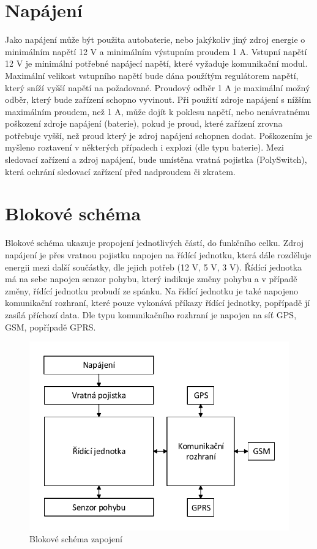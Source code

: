 \documentclass[FM,BP]{tulthesis}  %
\begin{document}
\section{Napájení}
Jako napájení může být použita autobaterie, nebo jakýkoliv jiný zdroj energie o minimálním napětí 12 V a minimálním výstupním proudem 1 A. Vstupní napětí 12 V je minimální potřebné napájecí napětí, které vyžaduje komunikační modul. Maximální velikost vstupního napětí bude dána použítým regulátorem napětí, který sníží vyšší napětí na požadované. Proudový odběr 1 A je maximální možný odběr, který bude zařízení schopno vyvinout. Při použití zdroje napájení s nížším maximálním proudem, než 1 A, může dojít k poklesu napětí, nebo nenávratnému poškození zdroje napájení (baterie), pokud je proud, které zařízení zrovna potřebuje vyšší, než proud který je zdroj napájení schopnen dodat. Poškozením je myšleno roztavení v některých případech i explozi (dle typu baterie). Mezi sledovací zařízení a zdroj napájení, bude umístěna vratná pojistka (PolySwitch), která ochrání sledovací zařízení před nadproudem či zkratem. 

\section{Blokové schéma}
Blokové schéma ukazuje propojení jednotlivých částí, do funkčního celku. Zdroj napájení je přes vratnou pojistku napojen na řídící jednotku, která dále rozděluje energii mezi další součástky, dle jejich potřeb (12 V, 5 V, 3 V). Řídící jednotka má na sebe napojen senzor pohybu, který indikuje změny pohybu a v případě změny, řídící jednotku probudí ze spánku. Na řídící jednotku je také napojeno komunikační rozhraní, které pouze vykonává příkazy řídící jednotky, popřípadě jí zasílá příchozí data. Dle typu komunikačního rozhraní je napojen na síť GPS, GSM, popřípadě GPRS.

\begin{figure}[H]
\begin{center}
\includegraphics[width=\textwidth]{graphs/schema_blokove.pdf}
\caption{Blokové schéma zapojení}
\label{image}
\end{center}
\end{figure}
\end{document}
